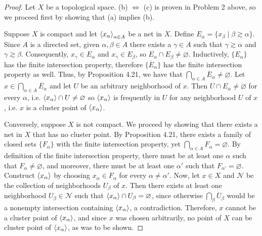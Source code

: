 \documentclass[11pt,oneside,english]{amsart}
\theoremstyle{definition}
\newcommand{\MC}[1]{\mathcal{#1}}
\def\<#1>{\mathinner{\langle#1\rangle}}
\begin{document}
\begin{enumerate}
\begin{proof}
Let $X$ be a topological space. (b) $\Longleftrightarrow$ (c) is proven in Problem 2 above, so we proceed first by showing that (a) implies (b).

Suppose $X$ is compact and let $\<x_\alpha>_{\alpha\in A}$ be a net in $X$. Define $E_\alpha=\{x_\beta\mid\beta\gtrsim\alpha\}$. Since $A$ is a directed set, given $\alpha,\beta\in A$ there exists a $\gamma\in A$ such that $\gamma\gtrsim\alpha$ and $\gamma\gtrsim\beta$. Consequently, $x_\gamma\in E_\alpha$ and $x_\gamma\in E_\beta$, so $E_\alpha\cap E_\beta\neq\varnothing$. Inductively, $\{E_\alpha\}$ has the finite intersection property, therefore $\{\overline{E}_\alpha\}$ has the finite intersection property as well. Thus, by Proposition 4.21, we have that $\bigcap_{\alpha\in A}\overline{E}_\alpha\neq\varnothing$. Let $x\in\bigcap_{\alpha\in A}\overline{E}_\alpha$ and let $U$ be an arbitrary neighborhood of $x$. Then $U\cap E_\alpha\neq\varnothing$ for every $\alpha$, i.e. $\<x_\alpha>\cap U\neq\varnothing$ so $\<x_\alpha>$ is frequently in $U$ for any neighborhood $U$ of $x$, i.e. $x$ is a cluster point of $\<x_\alpha>$.

Conversely, suppose $X$ is not compact. We proceed by showing that there exists a net in $X$ that has no cluster point. By Proposition 4.21, there exists a family of closed sets $\{F_\alpha\}$ with the finite intersection property, yet $\bigcap_{\alpha\in A}F_\alpha=\varnothing$. By definition of the finite intersection property, there must be at least one $\alpha$ such that $F_\alpha\neq\varnothing$, and moreover, there must be at least one $\alpha'$ such that $F_{\alpha'}=\varnothing$. Construct $\<x_\alpha>$ by choosing $x_\alpha\in F_\alpha$ for every $\alpha\neq\alpha'$. Now, let $x\in X$ and $\MC{N}$ be the collection of neighborhoods $U_\beta$ of $x$. Then there exists at least one neighborhood $U_\beta\in\MC{N}$ such that $\<x_\alpha>\cap U_\beta=\varnothing$, since otherwise $\bigcap_\beta \overline{U}_\beta$ would be a nonempty intersection containing $\<x_\alpha>$, a contradiction. Therefore, $x$ cannot be a cluster point of $\<x_\alpha>$, and since $x$ was chosen arbitrarily, no point of $X$ can be cluster point of $\<x_\alpha>$, as was to be shown.
\end{proof}

\end{enumerate}
\end{document}
